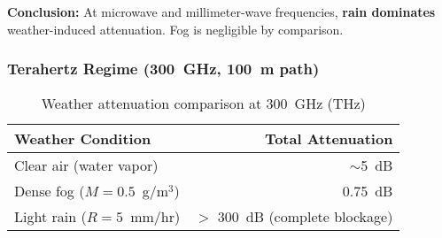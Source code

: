 \textbf{Conclusion:} At microwave and millimeter-wave frequencies, \textbf{rain dominates} weather-induced attenuation. Fog is negligible by comparison.

\subsubsection{Terahertz Regime (300~GHz, 100~m path)}

\begin{table}[h!]
\centering
\caption{Weather attenuation comparison at 300~GHz (THz)}
\label{tab:rain-fog-300ghz}
\begin{tabular}{@{}lr@{}}
\toprule
Weather Condition & Total Attenuation \\
\midrule
Clear air (water vapor) & $\sim$5~dB \\
Dense fog ($M = 0.5$~g/m$^3$) & 0.75~dB \\
Light rain ($R = 5$~mm/hr) & $>$ 300~dB (complete blockage) \\
\bottomrule
\end{tabular}
\end{table}

